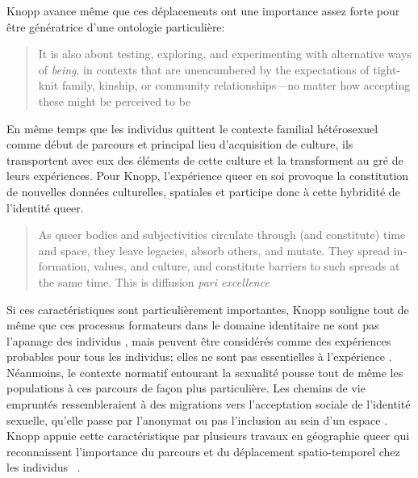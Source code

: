 Knopp avance même que ces déplacements ont une importance assez forte pour être génératrice d'une ontologie particulière:
\foreignblockquote{english}[{\cite[123]{Knopp2004}}][.]{It is also about testing, exploring, and experimenting with alternative ways of \emph{being}, in contexts that are unencumbered by the expectations of tight-knit family, kinship, or community relationships—no matter how accepting these might be perceived to be}
En même temps que les individus \lgbt{} quittent le contexte familial hétérosexuel comme début de parcours et principal lieu d'acquisition de culture, ils transportent avec eux des éléments de cette culture et la transforment au gré de leurs expériences.
Pour Knopp, l'expérience queer en soi provoque la constitution de nouvelles données culturelles, spatiales et participe donc à cette hybridité de l'identité queer.
\foreignblockquote{english}[{\cite[130]{Knopp2004}}][.]{As queer bodies and subjectivities circulate through (and constitute) time and space, they leave legacies, absorb others, and mutate. They spread information, values, and culture, and constitute barriers to such spreads at the same time. This is diffusion \emph{pari excellence}}

Si ces caractéristiques sont particulièrement importantes, Knopp souligne tout de même que ces processus formateurs dans le domaine identitaire ne sont pas l'apanage des individus \lgbt{}, mais peuvent être considérés comme des expériences probables pour tous les individus; elles ne sont pas essentielles à l'expérience \lgbt{}.
Néanmoins, le contexte normatif entourant la sexualité pousse tout de même les populations \lgbt{} à ces parcours de façon plus particulière.
Les chemins de vie empruntés ressembleraient à des migrations vers l'acceptation sociale de l'identité sexuelle, qu'elle passe par l'anonymat ou pas l'inclusion au sein d'un espace \lgbt{}.
Knopp appuie cette caractéristique par plusieurs travaux en géographie queer qui reconnaissent l'importance du parcours et du déplacement spatio-temporel chez les individus \lgbt{}~\citep[123]{Knopp2004}.

